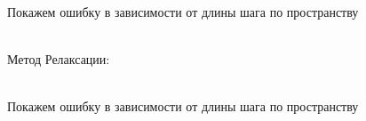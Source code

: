 \documentclass[12pt]{article}
\begin{document}
\begin{enumerate}
\begin{figure}[h]
            \label{ris:image}
        \end{figure}\\
        Покажем ошибку в зависимости от длины шага по пространству
        \begin{figure}[h]
            \label{ris:image}
        
        \end{figure}\\
        \newpage
                Метод Релаксации:
        \begin{figure}[h]
            \label{ris:image}
        \end{figure}\\
        Покажем ошибку в зависимости от длины шага по пространству

        \begin{figure}[h]
            \label{ris:image}
        \end{figure}\\

        \newpage



\end{enumerate}
\end{document}
